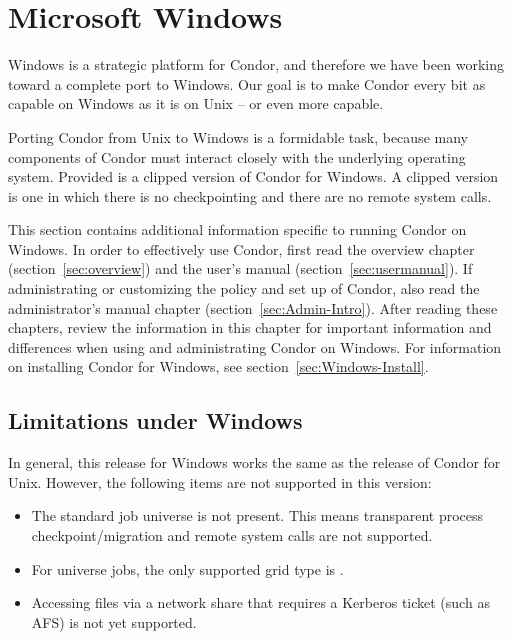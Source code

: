 \section{\label{sec:platform-windows}Microsoft Windows}

Windows is a strategic platform for Condor,
and therefore we have been working toward a complete
port to Windows.
Our goal is to make Condor every bit as capable on Windows as it is on
Unix -- or even more capable.

Porting Condor from Unix to Windows is a formidable task,
because many
components of Condor must interact closely with the underlying operating
system.
Provided is a clipped version of Condor for Windows.
A clipped version is one in which there is no checkpointing
and there are no remote system calls.

This section contains additional information specific to running
Condor on Windows.
In order to effectively use Condor, first read the overview
chapter (section~\ref{sec:overview})
and the user's manual (section~\ref{sec:usermanual}).
If administrating or customizing the policy and set up of Condor,
also read the administrator's manual 
chapter (section~\ref{sec:Admin-Intro}).
After reading these chapters,
review the information in this chapter for
important information and differences when using and administrating
Condor on Windows.
For information on installing Condor for Windows, see
section~\ref{sec:Windows-Install}.



\subsection{Limitations under Windows}

In general, this release for Windows works the same as the 
release of Condor for Unix.
However, the following items are not supported in this version:

\begin{itemize}

\item The standard job universe is not present.  This means
transparent process checkpoint/migration and remote system calls are
not supported.

\item For  universe jobs, the only supported grid type is
.

\item Accessing files via a network share that requires a Kerberos ticket
(such as AFS) is not yet supported.

\end{itemize}


